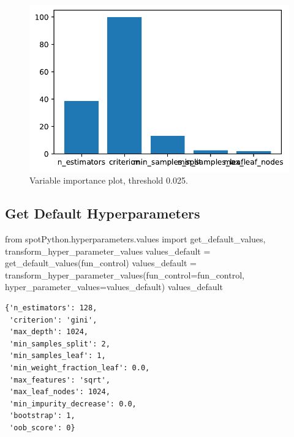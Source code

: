 \documentclass[
  letterpaper,
  DIV=11,
  numbers=noendperiod]{scrreprt}
\newenvironment{Shaded}{\begin{snugshade}}{\end{snugshade}}
\newcommand{\ImportTok}[1]{\textcolor[rgb]{0.00,0.46,0.62}{#1}}
\newcommand{\NormalTok}[1]{\textcolor[rgb]{0.00,0.23,0.31}{#1}}
\newcommand{\OperatorTok}[1]{\textcolor[rgb]{0.37,0.37,0.37}{#1}}
\begin{document}
\begin{figure}[H]

{\centering \includegraphics{16_spot_hpt_sklearn_multiclass_classification_randomforest_files/figure-pdf/cell-30-output-1.pdf}

}

\caption{Variable importance plot, threshold 0.025.}

\end{figure}

\hypertarget{get-default-hyperparameters-3}{%
\subsection{Get Default
Hyperparameters}\label{get-default-hyperparameters-3}}

\begin{Shaded}
\begin{Highlighting}[]
\ImportTok{from}\NormalTok{ spotPython.hyperparameters.values }\ImportTok{import}\NormalTok{ get\_default\_values, transform\_hyper\_parameter\_values}
\NormalTok{values\_default }\OperatorTok{=}\NormalTok{ get\_default\_values(fun\_control)}
\NormalTok{values\_default }\OperatorTok{=}\NormalTok{ transform\_hyper\_parameter\_values(fun\_control}\OperatorTok{=}\NormalTok{fun\_control, hyper\_parameter\_values}\OperatorTok{=}\NormalTok{values\_default)}
\NormalTok{values\_default}
\end{Highlighting}
\end{Shaded}

\begin{verbatim}
{'n_estimators': 128,
 'criterion': 'gini',
 'max_depth': 1024,
 'min_samples_split': 2,
 'min_samples_leaf': 1,
 'min_weight_fraction_leaf': 0.0,
 'max_features': 'sqrt',
 'max_leaf_nodes': 1024,
 'min_impurity_decrease': 0.0,
 'bootstrap': 1,
 'oob_score': 0}
\end{verbatim}
\end{document}
